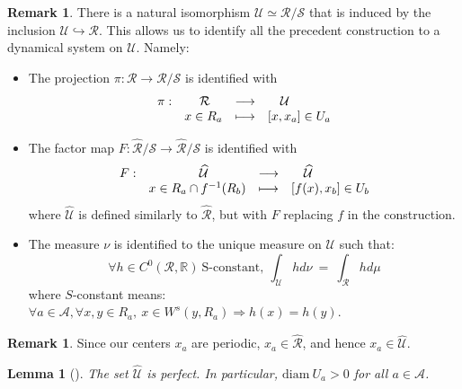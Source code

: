 \documentclass[a4paper]{article}
\newtheorem{lemma}[theorem]{Lemma}
\theoremstyle{definition}
\newtheorem{remark}[example]{Remark}
\begin{document}
\begin{remark}

There is a natural isomorphism $\mathcal{U} \simeq \mathcal{R}/\mathcal{S}$ that is induced by the inclusion $\mathcal{U} \hookrightarrow \mathcal{R}$. This allows us to identify all the precedent construction to a dynamical system on $\mathcal{U}$. Namely:

\begin{itemize}
    \item The projection $\pi: \mathcal{R} \rightarrow \mathcal{R}/\mathcal{S}$ is identified with
    $$ \begin{array}[t]{lrcl}
 \pi: & \mathcal{R} \quad & \longrightarrow & \quad \mathcal{U} \\
    & x \in R_a & \longmapsto &  [x,x_a] \in U_a  \end{array}  $$
    
    \item The factor map $F:\widehat{\mathcal{R}}/\mathcal{S} \rightarrow \widehat{\mathcal{R}}/\mathcal{S}$ is identified with
    $$ \begin{array}[t]{lrcl}
 F: & \widehat{\mathcal{U}} \quad \quad \quad & \longrightarrow & \quad \widehat{\mathcal{U}} \\
    & x \in R_a \cap f^{-1}(R_b)  & \longmapsto &  [f(x),x_b] \in U_b  \end{array}   $$
    where $\widehat{\mathcal{U}}$ is defined similarly to $\widehat{\mathcal{R}}$, but with $F$ replacing $f$ in the construction.
    
    \item The measure $\nu$ is identified to the unique measure on $\mathcal{U}$ such that:
    $$ \forall h \in C^0(\mathcal{R},\mathbb{R}) \ \text{S-constant}, \ \int_\mathcal{U} h d\nu \ = \ \int_\mathcal{R} h d\mu $$
    where $S$-constant means:  $\forall a \in \mathcal{A}, \forall x,y \in R_a, \ x \in W^s(y,R_a) \Rightarrow h(x)=h(y)$.
    
\end{itemize}
\end{remark}

\begin{remark}
Since our centers $x_a$ are periodic, $x_a \in \widehat{\mathcal{R}}$, and hence $x_a \in \widehat{\mathcal{U}}$.
\end{remark}

\begin{lemma}[\cite{Le24,Le23b}]
The set $\widehat{\mathcal{U}}$ is perfect. In particular, $\text{diam} \ U_a > 0$ for all $a \in \mathcal{A}$.

\end{lemma}
\end{document}
